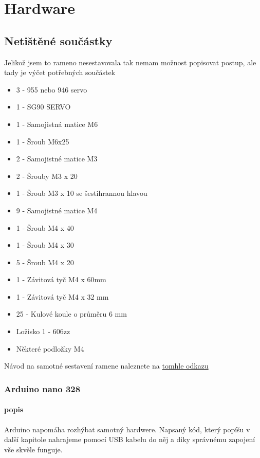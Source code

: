 \documentclass[12pt, a4paper,
twoside,        %
openright
]{report}
\begin{document}
{\chapter{Hardware}
	\section{Netištěné součástky}
Jelikož jsem to rameno nesestavovala tak nemam možnost popisovat postup, ale tady je výčet potřebných součástek 

\begin{itemize}
	\item	 3 - 955 nebo 946 servo
	\item 	1 - SG90 SERVO
	\item 	1 - Samojistná matice M6
	\item 	1 - Šroub M6x25
	\item 	2 - Samojistné matice M3
	\item 	2 - Šrouby M3 x 20
	\item 	1 - Šroub M3 x 10 se šestihrannou hlavou
	\item 	9 - Samojistné matice M4
	\item 	1 - Šroub M4 x 40
	\item 	1 - Šroub M4 x 30
	\item 	5 - Šroub M4 x 20
	\item 	1 - Závitová tyč M4 x 60mm
	\item 	1 - Závitová tyč M4 x 32 mm
	\item 	25 - Kulové koule o průměru 6 mm
	\item 	Ložisko 1 - 606zz
	\item 	Některé podložky M4
\end{itemize}


Návod na samotné sestavení ramene naleznete na \href{https://www.instructables.com/EEZYbotARM-Mk2-3D-Printed-Robot/}{tomhle odkazu} 
\newpage 


\subsection{Arduino nano 328}
\subsubsection{popis}

Arduino napomáha rozhýbat samotný hardwere. Napsaný kód, který popíšu v další kapitole nahrajeme pomocí USB kabelu do něj a diky správnému zapojení vše skvěle funguje.


}
\end{document}
